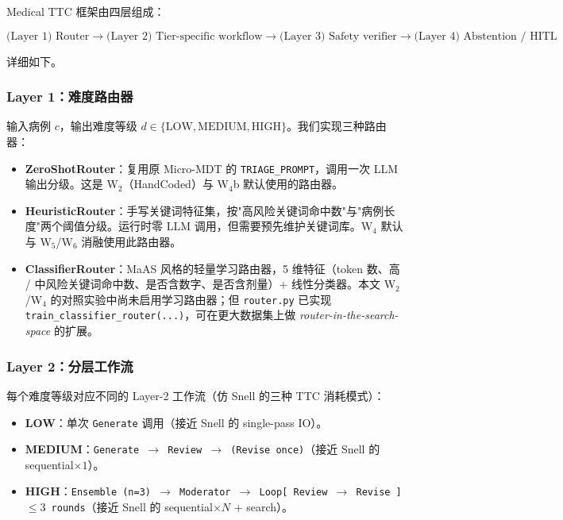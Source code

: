 \documentclass[11pt,a4paper]{ctexart}
\begin{document}
Medical TTC 框架由四层组成：

\begin{equation*}
\text{(Layer 1) Router} \to \text{(Layer 2) Tier-specific workflow} \to \text{(Layer 3) Safety verifier} \to \text{(Layer 4) Abstention / HITL}
\end{equation*}

详细如下。

\subsubsection{Layer 1：难度路由器}

输入病例 $c$，输出难度等级 $d \in \{\mathrm{LOW, MEDIUM, HIGH}\}$。我们实现三种路由器：

\begin{itemize}
    \item \textbf{ZeroShotRouter}：复用原 Micro-MDT 的 \texttt{TRIAGE\_PROMPT}，调用一次 LLM 输出分级。这是 W$_2$（HandCoded）与 W$_4$b 默认使用的路由器。
    \item \textbf{HeuristicRouter}：手写关键词特征集，按"高风险关键词命中数"与"病例长度"两个阈值分级。运行时零 LLM 调用，但需要预先维护关键词库。W$_4$ 默认与 W$_5$/W$_6$ 消融使用此路由器。
    \item \textbf{ClassifierRouter}：MaAS \cite{maas2025} 风格的轻量学习路由器，5 维特征（token 数、高 / 中风险关键词命中数、是否含数字、是否含剂量）+ 线性分类器。本文 W$_2$/W$_4$ 的对照实验中尚未启用学习路由器；但 \texttt{router.py} 已实现 \texttt{train\_classifier\_router(...)}，可在更大数据集上做 \emph{router-in-the-search-space} 的扩展。
\end{itemize}

\subsubsection{Layer 2：分层工作流}

每个难度等级对应不同的 Layer-2 工作流（仿 Snell \cite{snell2024scaling} 的三种 TTC 消耗模式）：

\begin{itemize}
    \item \textbf{LOW}：单次 \texttt{Generate} 调用（接近 Snell 的 single-pass IO）。
    \item \textbf{MEDIUM}：\texttt{Generate $\to$ Review $\to$ (Revise once)}（接近 Snell 的 sequential$\times 1$）。
    \item \textbf{HIGH}：\texttt{Ensemble (n=3) $\to$ Moderator $\to$ Loop[ Review $\to$ Revise ] $\le 3$ rounds}（接近 Snell 的 sequential$\times N$ + search）。
\end{itemize}
\end{document}
